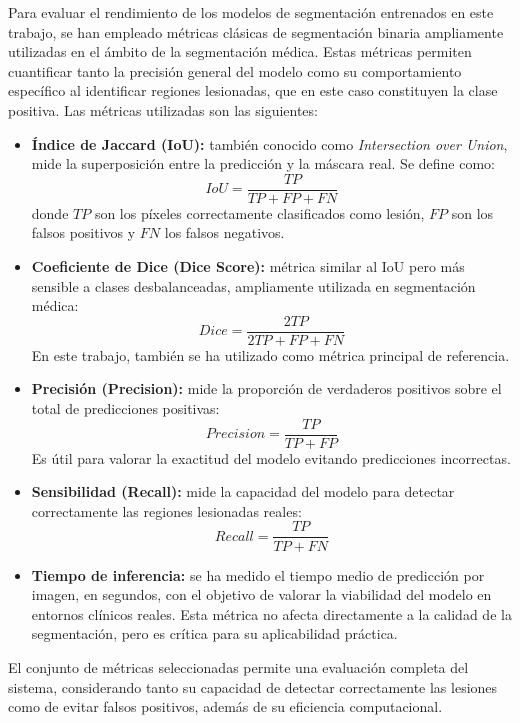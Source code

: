 \documentclass[../main.tex]{subfiles}
\begin{document}
Para evaluar el rendimiento de los modelos de segmentación entrenados en este trabajo, se han empleado métricas clásicas de segmentación binaria ampliamente utilizadas en el ámbito de la segmentación médica. Estas métricas permiten cuantificar tanto la precisión general del modelo como su comportamiento específico al identificar regiones lesionadas, que en este caso constituyen la clase positiva. Las métricas utilizadas son las siguientes:

\begin{itemize}
    \item \textbf{Índice de Jaccard (IoU):} también conocido como \textit{Intersection over Union}, mide la superposición entre la predicción y la máscara real. Se define como:
    \[
    IoU = \frac{TP}{TP + FP + FN}
    \]
    donde \(TP\) son los píxeles correctamente clasificados como lesión, \(FP\) son los falsos positivos y \(FN\) los falsos negativos.

    \item \textbf{Coeficiente de Dice (Dice Score):} métrica similar al IoU pero más sensible a clases desbalanceadas, ampliamente utilizada en segmentación médica:
    \[
    Dice = \frac{2TP}{2TP + FP + FN}
    \]
    En este trabajo, también se ha utilizado como métrica principal de referencia.

    \item \textbf{Precisión (Precision):} mide la proporción de verdaderos positivos sobre el total de predicciones positivas:
    \[
    Precision = \frac{TP}{TP + FP}
    \]
    Es útil para valorar la exactitud del modelo evitando predicciones incorrectas.

    \item \textbf{Sensibilidad (Recall):} mide la capacidad del modelo para detectar correctamente las regiones lesionadas reales:
    \[
    Recall = \frac{TP}{TP + FN}
    \]

    \item \textbf{Tiempo de inferencia:} se ha medido el tiempo medio de predicción por imagen, en segundos, con el objetivo de valorar la viabilidad del modelo en entornos clínicos reales. Esta métrica no afecta directamente a la calidad de la segmentación, pero es crítica para su aplicabilidad práctica.
\end{itemize}

El conjunto de métricas seleccionadas permite una evaluación completa del sistema, considerando tanto su capacidad de detectar correctamente las lesiones como de evitar falsos positivos, además de su eficiencia computacional.
\end{document}
